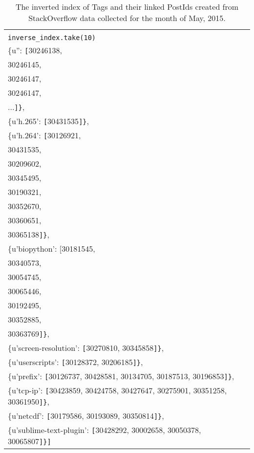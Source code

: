 \documentclass[]{article}
\newcommand{\code}[1]{\colorbox{light-gray}{\texttt{#1}}}
\begin{document}
\begin{table}[!ht]
	\begin{center}
		\caption{The inverted index of Tags and their linked PostIds created from StackOverflow data collected for the month of May, 2015.}
		\label{tab:table1}
		\begin{tabular}{|l|} 
			\hline
			\\
			\code{inverse\_index.take(10)}\\
			\hline
			\{u'': \verb|[|30246138,\\
				30246145,\\
				30246147,\\
				30246147,\\
				...\verb|]}|,\\
		\{u'h.265': \verb|[|30431535\verb|]}|,\\
			\{u'h.264': \verb|[|30126921,\\
				30431535,\\
				30209602,\\
				30345495,\\
				30190321,\\
				30352670,\\
				30360651,\\
				30365138\verb|]}|,\\
			\{u'biopython': [30181545,\\
				30340573,\\
				30054745,\\
				30065446,\\
				30192495,\\
				30352885,\\
				30363769\verb|]}|,\\
			\{u'screen-resolution': \verb|[|30270810, 30345858\verb|]}|,\\
			\{u'userscripts': \verb|[|30128372, 30206185\verb|]}|,\\
			\{u'prefix': \verb|[|30126737, 30428581, 30134705, 30187513, 30196853\verb|]}|,\\
		\{u'tcp-ip': \verb|[|30423859, 30424758, 30427647, 30275901, 30351258, 30361950\verb|]}|,\\
			\{u'netcdf': \verb|[|30179586, 30193089, 30350814\verb|]}|,\\
			\{u'sublime-text-plugin': \verb|[|30428292, 30002658, 30050378, 30065807\verb|]}]|\\
			\hline
		\end{tabular}
	\end{center}
\end{table}
\end{document}
